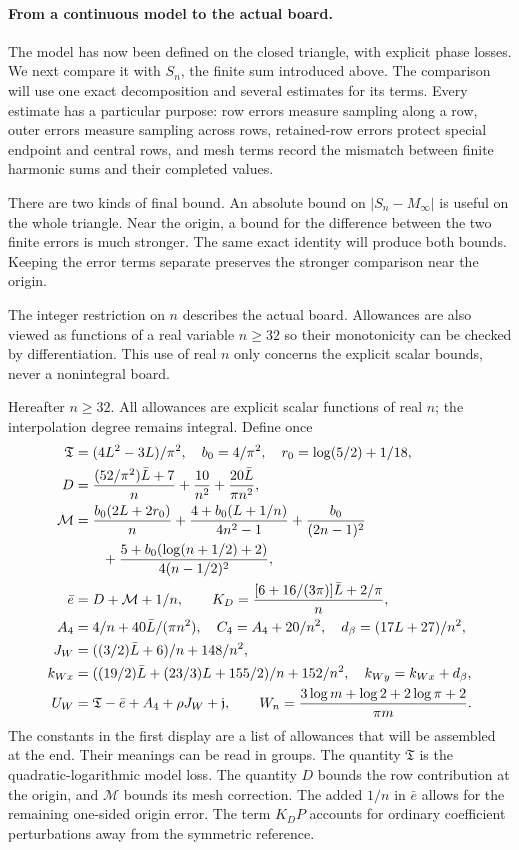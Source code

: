 \paragraph{From a continuous model to the actual board.}
The model has now been defined on the closed triangle, with explicit
phase losses. We next compare it with $S_n$, the finite sum introduced
above. The comparison will use one exact decomposition and several
estimates for its terms. Every estimate has a particular purpose: row
errors measure sampling along a row, outer errors measure sampling
across rows, retained-row errors protect special endpoint and central
rows, and mesh terms record the mismatch between finite harmonic sums
and their completed values.

There are two kinds of final bound. An absolute bound on
$|S_n-M_\infty|$ is useful on the whole triangle. Near the origin,
a bound for the difference between the two finite errors is much
stronger. The same exact identity will produce both bounds. Keeping
the error terms separate preserves the stronger comparison near the origin.

The integer restriction on $n$ describes the actual board. Allowances
are also viewed as functions of a real variable $n\geq32$ so their
monotonicity can be checked by differentiation. This use of real $n$
only concerns the explicit scalar bounds, never a nonintegral board.

Hereafter $n\geq32$. All allowances are explicit scalar functions of
real $n$; the interpolation degree remains integral. Define once
\begin{align}\label{uc:constants}
 \mathfrak{T}&=(4L^2-3L)/\pi^2,\quad b_0=4/\pi^2,\quad r_0=\log(5/2)+1/18,\notag\\
 D&=\frac{(52/\pi^2)\bar L+7}{n}+\frac{10}{n^2}+\frac{20\bar L}{\pi n^2},\notag\\
 \mathcal M&=\frac{b_0(2L+2r_0)}n
 +\frac{4+b_0(L+1/n)}{4n^2-1}+\frac{b_0}{(2n-1)^2}\notag\\
 &\qquad+\frac{5+b_0(\log(n+1/2)+2)}{4(n-1/2)^2},\notag\\
 \bar e&=D+\mathcal M+1/n,\qquad
 K_D=\frac{[6+16/(3\pi)]\bar L+2/\pi}{n},\notag\\
 A_4&=4/n+40\bar L/(\pi n^2),\quad C_4=A_4+20/n^2,
 \quad d_\beta=(17L+27)/n^2,\notag\\
 J_W&=((3/2)\bar L+6)/n+148/n^2,\notag\\
 k_{Wx}&=((19/2)\bar L+(23/3)L+155/2)/n+152/n^2,
 \quad k_{Wy}=k_{Wx}+d_\beta,\notag\\
 U_W&=\mathfrak{T}-\bar e+A_4+\rho J_W+\mathfrak j,\qquad
 W_n=\frac{3\log m+\log2+2\log\pi+2}{\pi m}.
\end{align}
The constants in the first display are a list of allowances that will
be assembled at the end. Their meanings can be read in groups.
The quantity $\mathfrak{T}$ is the quadratic-logarithmic model loss. The quantity
$D$ bounds the row contribution at the origin, and $\mathcal M$
bounds its mesh correction. The added $1/n$ in $\bar e$ allows for
the remaining one-sided origin error. The term $K_DP$ accounts for
ordinary coefficient perturbations away from the symmetric reference.

